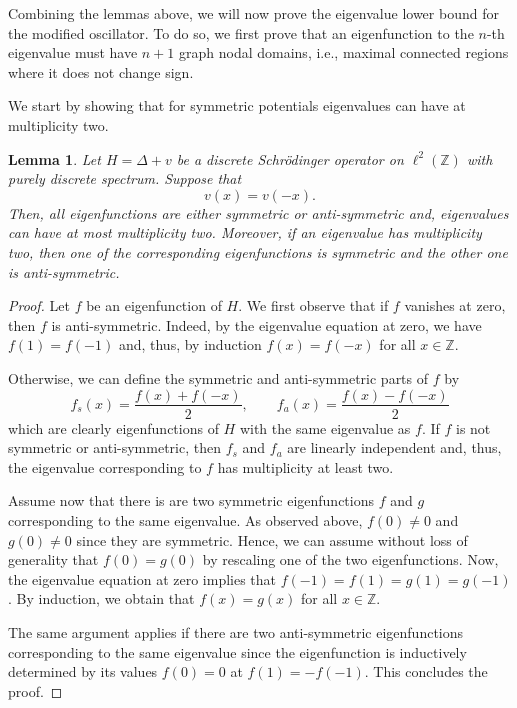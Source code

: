 \documentclass[12pt, reqno]{amsart}
\newtheorem{lemma}[theorem]{Lemma}
\theoremstyle{definition}
\numberwithin{equation}{section}
\newcommand{\Z}{{\mathbb Z}}
\begin{document}
Combining the lemmas above,  we will now prove the eigenvalue lower bound for the modified oscillator. To do so, we first prove that an eigenfunction to the $n$-th eigenvalue must have  $n+1$ graph nodal domains, i.e., {maximal connected} regions where it does not change sign.

We start by showing that for symmetric potentials eigenvalues can have  at multiplicity two.



\begin{lemma}\label{lem:degenracy} Let $H=\Delta+v$ be a discrete Schr\"odinger operator on  $\ell^2( \Z)$ with purely discrete spectrum. Suppose that \begin{equation*}
  	v(x) = v(-x).
  \end{equation*}
 Then, all eigenfunctions are either symmetric or anti-symmetric and,  eigenvalues can have at most multiplicity two. Moreover, if an eigenvalue has multiplicity two, then one of the corresponding eigenfunctions is symmetric and the other one is anti-symmetric. 
\end{lemma}
\begin{proof}
    Let $ f $ be an eigenfunction of $H$. 
    We first observe that if $f$ vanishes at zero, then $f$ is anti-symmetric. Indeed, by the eigenvalue equation at zero, we have $f(1)=f(-1)$ and, thus, by induction $f(x)=f(-x)$ for all $x\in \Z$. 
    
    Otherwise, we can define the symmetric and anti-symmetric parts of $f$ by
$$f_s(x)=\frac{f(x)+f(-x)}{2},\qquad f_a(x)=\frac{f(x)-f(-x)}{2}$$
which are clearly eigenfunctions of $H$ with the same eigenvalue as $f$. If $f$ is not symmetric or anti-symmetric, then $f_s$ and $f_a$ are linearly independent and, thus, the eigenvalue corresponding to $f$ has multiplicity at least two. 


Assume now that there is are two symmetric eigenfunctions $f$ and $g$ corresponding to the same eigenvalue. As observed above, $f(0)\neq 0$ and $g(0)\neq 0$ since they are symmetric. Hence, we can assume without loss of generality that $f(0)=g(0)$ by rescaling one of the two eigenfunctions. Now, the eigenvalue equation at zero implies that $f(-1)=f(1)=g(1)=g(-1)$. By induction, we obtain that $f(x)=g(x)$ for all $x\in \Z$.

The same argument applies if there are two anti-symmetric eigenfunctions corresponding to the same eigenvalue since the eigenfunction is inductively determined by its values $f(0)=0$ at $f(1)=-f(-1)$. This concludes the proof.
\end{proof}
\end{document}
